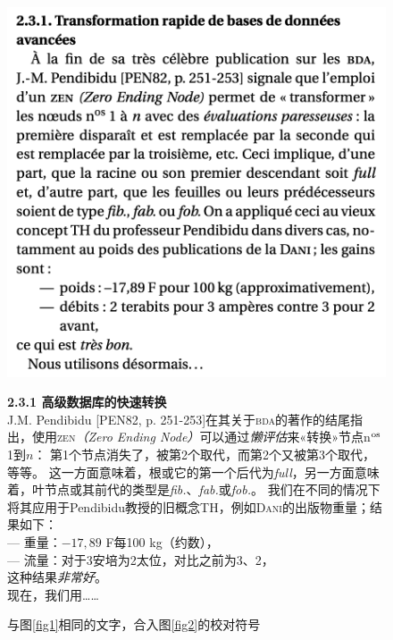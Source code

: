 \begin{figure}
    \centering
    \includegraphics[width = \linewidth]{img/3.png}

\begin{mdframed}
    \footnotesize
    \textbf{2.3.1 \quad 高级数据库的快速转换}\\
    J.M. Pendibidu [PEN82, p. 251-253]在其关于\textsc{bda}的著作的结尾指出，使用\textsc{zen}\emph{（Zero Ending Node）}可以通过\emph{懒评估}来«转换»节点n$^{\rm os}$ 1到$n$：
    第1个节点消失了，被第2个取代，而第2个又被第3个取代，等等。
    这一方面意味着，根或它的第一个后代为\emph{full}，另一方面意味着，叶节点或其前代的类型是\emph{fib.}、\emph{fab.}或\emph{fob.}。
    我们在不同的情况下将其应用于Pendibidu教授的旧概念TH，例如\textsc{Dani}的出版物重量；结果如下：\\
    \mbox{\qquad} ---  重量：$-17,89$ F每100 kg（约数），\\
    \mbox{\qquad} ---  流量：对于3安培为2太位，对比之前为3、2，\\
    这种结果\emph{非常好}。\\
    现在，我们用……
\end{mdframed}

    \caption{与图\ref{fig1}相同的文字，合入图\ref{fig2}的校对符号}
    \label{fig3}
\end{figure}